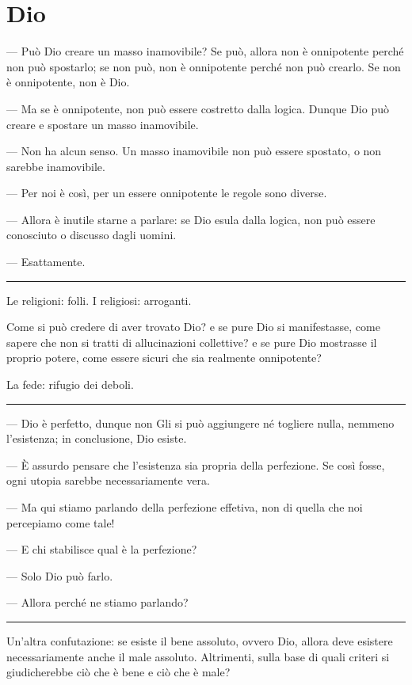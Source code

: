 \chapter{Dio}
\label{ch:dio}

--- Può Dio creare un masso inamovibile? Se può, allora non è onnipotente perché
non può spostarlo; se non può, non è onnipotente perché non può crearlo. Se
non è onnipotente, non è Dio.

--- Ma se è onnipotente, non può essere costretto dalla logica. Dunque Dio
può creare e spostare un masso inamovibile.

--- Non ha alcun senso. Un masso inamovibile non può essere spostato, o non
sarebbe inamovibile.

--- Per noi è così, per un essere onnipotente le regole sono diverse.

--- Allora è inutile starne a parlare: se Dio esula dalla logica, non può essere
conosciuto o discusso dagli uomini.

--- Esattamente.

\plainbreak{1}

Le religioni: folli. I religiosi: arroganti.

Come si può credere di aver trovato Dio? e se pure Dio si manifestasse, come
sapere che non si tratti di allucinazioni collettive? e se pure Dio mostrasse il
proprio potere, come essere sicuri che sia realmente onnipotente?

La fede: rifugio dei deboli.

\plainbreak{1}

--- Dio è perfetto, dunque non Gli si può aggiungere né togliere nulla,
nemmeno l'esistenza; in conclusione, Dio esiste.

--- È assurdo pensare che l'esistenza sia propria della perfezione. Se così
fosse, ogni utopia sarebbe necessariamente vera.

--- Ma qui stiamo parlando della perfezione effetiva, non di quella che noi
percepiamo come tale!

--- E chi stabilisce qual è la perfezione?

--- Solo Dio può farlo.

--- Allora perché ne stiamo parlando?

\plainbreak{1}

Un'altra confutazione: se esiste il bene assoluto, ovvero Dio, allora deve
esistere necessariamente anche il male assoluto. Altrimenti, sulla base di quali
criteri si giudicherebbe ciò che è bene e ciò che è male?


